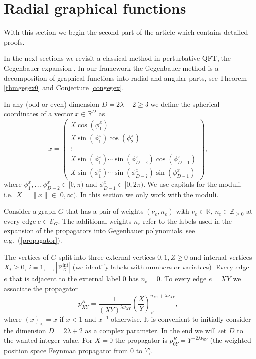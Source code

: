 \documentclass[oneside]{amsart}
\newcommand{\RR}{{\mathbb R}}
\newcommand{\ZZ}{{\mathbb Z}}
\newcommand{\sE}{\mathcal{E}}
\newcommand{\sV}{\mathcal{V}}
\newcommand{\sVGint}{{\sV_G^\mathrm{int}}}
\newcommand{\VGint}{{|\sVGint|}}
\theoremstyle{plain}
\begin{document}
\section{Radial graphical functions}\label{sectrad}
With this section we begin the second part of the article which contains detailed proofs.

In the next sections we revisit a classical method in perturbative QFT, the Gegenbauer expansion \cite{geg}. In our framework the Gegenbauer method is a
decomposition of graphical functions into radial and angular parts, see Theorem \ref{thmgegex0} and Conjecture \ref{congegex}.

In any (odd or even) dimension $D=2\lambda+2\geq3$ we define the spherical coordinates of a vector $x\in\RR^D$ as
\begin{equation}\label{angularcoords}
x=\left(\begin{array}{c}X\cos(\phi^x_1)\\
X\sin(\phi^x_1)\cos(\phi^x_2)\\
\vdots\\
X\sin(\phi^x_1)\cdots\sin(\phi^x_{D-2})\cos(\phi^x_{D-1})\\
X\sin(\phi^x_1)\cdots\sin(\phi^x_{D-2})\sin(\phi^x_{D-1})\end{array}\right),
\end{equation}
where $\phi^x_1,\ldots,\phi^x_{D-2}\in[0,\pi)$ and $\phi^x_{D-1}\in[0,2\pi)$. We use capitals for the moduli, i.e.\ $X=\|x\|\in[0,\infty)$.
In this section we only work with the moduli.

Consider a graph $G$ that has a pair of weights $(\nu_e,n_e)$ with $\nu_e\in\RR$, $n_e\in\ZZ_{\geq0}$ at every edge $e\in\sE_G$. The additional weights $n_e$ refer to
the labels used in the expansion of the propagators into Gegenbauer polynomials, see e.g.\ (\ref{propagator}).

The vertices of $G$ split into three external vertices $0,1,Z\geq0$ and internal vertices $X_i\geq0$, $i=1,\ldots,\VGint$ (we identify labels with numbers or variables).
Every edge $e$ that is adjacent to the external label 0 has $n_e=0$. To every edge $e=XY$ we associate the propagator
\begin{equation}\label{propdef}
p^R_{XY}=\frac{1}{(XY)^{\lambda\nu_{XY}}}\genfrac(){}{}{X}{Y}^{n_{XY}+\lambda\nu_{XY}}_<,
\end{equation}
where $(x)_<=x$ if $x<1$ and $x^{-1}$ otherwise. It is convenient to initially consider the dimension $D=2\lambda+2$ as a complex parameter. In the end we will set $D$ to the wanted integer value.
For $X=0$ the propagator is $p^R_{0Y}=Y^{-2\lambda\nu_{0Y}}$ (the weighted position space Feynman propagator from 0 to $Y$).
\end{document}
